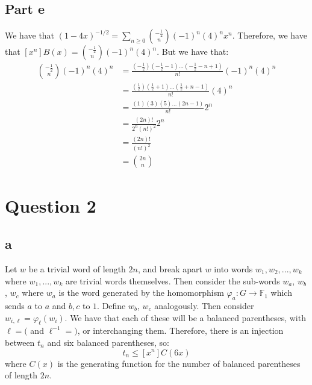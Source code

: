\documentclass[]{article}
\begin{document}
\subsection{Part e}
We have that $(1-4x)^{-1/2} =\sum_{n \geq 0} \binom{-\frac{1}{2}}{n}(-1)^n (4)^n x^n$. Therefore, we have that $[x^n] B(x) = \binom{-\frac{1}{2}}{n}(-1)^n (4)^n$. But we have that:
\begin{align*}
	\binom{-\frac{1}{2}}{n}(-1)^n (4)^n &= \frac{(-\frac{1}{2})(-\frac{1}{2} - 1) ... (-\frac{1}{2} - n + 1)}{n!} (-1)^n (4)^n\\
	&= \frac{(\frac{1}{2})(\frac{1}{2} + 1) ... (\frac{1}{2} + n - 1)}{n!}(4)^n\\
	&= \frac{(1)(3)(5) ... (2n-1)}{n!} 2^n\\
	&= \frac{(2n)!}{2^n (n!)^2}2^n\\
	&= \frac{(2n)!}{(n!)^2}\\
	&= \binom{2n}{n}
\end{align*}
\newpage
\section{Question 2}
\subsection*{a}
Let $w$ be a trivial word of length $2n$, and break apart $w$ into words $w_1, w_2, ... , w_k$ where $w_1, ..., w_k$ are trivial words themselves. Then consider the sub-words $w_a$, $w_b$, $w_c$ where $w_a$ is the word generated by the homomorphism $\varphi_a: G \rightarrow \mathbb{F}_1$ which sends $a$ to $a$ and $b, c$ to $1$. Define $w_b$, $w_c$ analogously. Then consider $w_{i, \ell} = \varphi_\ell(w_i)$. We have that each of these will be a balanced parentheses, with $\ell = ($ and $\ell^{-1} = )$, or interchanging them. Therefore, there is an injection between $t_n$ and six balanced parentheses, so:
\begin{equation}
	t_n \leq [x^n]C(6x)
\end{equation}
where $C(x)$ is the generating function for the number of balanced parentheses of length $2n$. 
\end{document}
